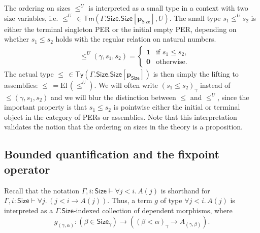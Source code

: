 \documentclass[10pt,a4paper]{article}
\theoremstyle{definition}
\theoremstyle{remark}
\renewcommand{\.}{.\,} %
\renewcommand{\:}{:} %
\newcommand{\El}{\mathrm{El}\,}
\newcommand{\Size}{\mathsf{Size}}
\newcommand{\0}{\mathbf{0}}
\newcommand{\1}{\mathbf{1}}
\newcommand\<\langle
\renewcommand\>\rangle
\newcommand{\Ty}{\mathsf{Ty}}
\newcommand{\Tm}{\mathsf{Tm}}
\newcommand{\p}{\mathbf{p}}
\newcommand{\U}{U}
\theoremstyle{remark}
\begin{document}
The ordering on sizes $\leq^\U$ is interpreted as a small type in a context with two size variables, i.e. $\leq^\U \,\in \Tm(\Gamma.\Size.\Size[\p_\Size], \U)$. The small type $s_1 \leq^\U s_2$ is either the terminal singleton PER or the initial empty PER, depending on whether $s_1 \leq s_2$ holds with the regular relation on natural numbers.
\begin{align*}
	& \le^U (\gamma, s_1, s_2) = 
	\begin{cases}
		\1 & \text{if } s_1 \le s_2,\\
		\0 & \text{otherwise}.
	\end{cases}
\end{align*}
The actual type $\le \, \in \Ty(\Gamma.\Size.\Size[\p_\Size])$ is then simply the lifting to assemblies: $\le \, = \El (\le^\U)$. We will often write $(s_1 \le s_2)_\gamma$ instead of $\le(\gamma, s_1, s_2)$ and we will blur the distinction between $\le$ and $\le^\U$, since the important property is that $s_1 \le s_2$ is pointwise either the initial or terminal object in the category of PERs or assemblies. Note that this interpretation validates the notion that the ordering on sizes in the theory is a proposition.




\subsection{Bounded quantification and the fixpoint operator}
Recall that the notation $\Gamma, i : \Size \vdash \forall j < i \. A(j)$ is shorthand for $\Gamma, i : \Size \vdash \forall j \. (j < i \to A(j))$. Thus, a term $g$ of type $\forall j < i \. A(j)$ is interpreted as a $\Gamma.\Size$-indexed collection of dependent morphisms, where
\[
g_{(\gamma, \alpha)} : (\beta \in \Size_\gamma) \to ((\beta < \alpha)_\gamma \to A_{(\gamma, \beta)}).
\]
\end{document}
